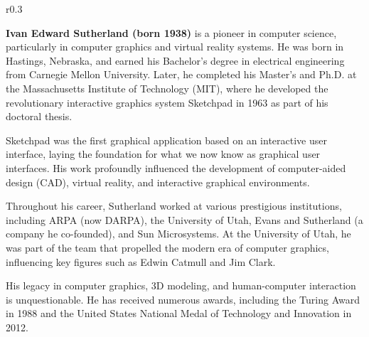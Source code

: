 \documentclass[12pt]{article}
\newcommand{\photoFilename}{images/IvanPhoto}
\newcommand{\photoClipPositionX}{0}
\newcommand{\photoClipPositionY}{0}
\newcommand{\photoSize}{6cm}
\begin{document}
\selectfont
\BgThispage
\begin{wrapfigure}{r}{0.3\textwidth}
\end{wrapfigure}


\textbf{Ivan Edward Sutherland (born 1938)} is a pioneer in computer science, particularly in computer graphics and virtual reality systems. He was born in Hastings, Nebraska, and earned his Bachelor's degree in electrical engineering from Carnegie Mellon University. Later, he completed his Master's and Ph.D. at the Massachusetts Institute of Technology (MIT), where he developed the revolutionary interactive graphics system Sketchpad in 1963 as part of his doctoral thesis.

Sketchpad was the first graphical application based on an interactive user interface, laying the foundation for what we now know as graphical user interfaces. His work profoundly influenced the development of computer-aided design (CAD), virtual reality, and interactive graphical environments.

Throughout his career, Sutherland worked at various prestigious institutions, including ARPA (now DARPA), the University of Utah, Evans and Sutherland (a company he co-founded), and Sun Microsystems. At the University of Utah, he was part of the team that propelled the modern era of computer graphics, influencing key figures such as Edwin Catmull and Jim Clark.

His legacy in computer graphics, 3D modeling, and human-computer interaction is unquestionable. He has received numerous awards, including the Turing Award in 1988 and the United States National Medal of Technology and Innovation in 2012.
\end{document}
